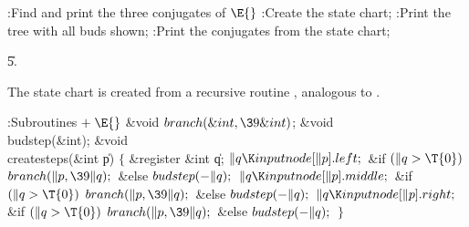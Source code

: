\B{}:Find and print the three conjugates of %
\X${}\E{}$\6
:Create the state chart\X;\6
:Print the tree with all buds shown\X;\6
:Print the conjugates from the state chart\X;\par
\U5.\fi

The state chart is created from a recursive
routine ,
analogous to .

\Y\B\4:Subroutines\X${}\mathrel+\E{}$\6
\&{void} ${}\\{branch}(\&{int},\39\&{int}){}$;\6
\&{void} \\{budstep}(\&{int});\7
\&{void} \\{createsteps}(\&{int} \|p)\1\1\2\2\6
${}\{{}$\1\6
\&{register} \&{int} \|q;\7
${}\|q\K\\{inputnode}[\|p].\\{left};{}$\6
\&{if} ${}(\|q>\T{0}){}$\1\5
${}\\{branch}(\|p,\39\|q);{}$\2\6
\&{else}\1\5
${}\\{budstep}({-}\|q);{}$\2\6
${}\|q\K\\{inputnode}[\|p].\\{middle};{}$\6
\&{if} ${}(\|q>\T{0}){}$\1\5
${}\\{branch}(\|p,\39\|q);{}$\2\6
\&{else}\1\5
${}\\{budstep}({-}\|q);{}$\2\6
${}\|q\K\\{inputnode}[\|p].\\{right};{}$\6
\&{if} ${}(\|q>\T{0}){}$\1\5
${}\\{branch}(\|p,\39\|q);{}$\2\6
\&{else}\1\5
${}\\{budstep}({-}\|q);{}$\2\6
\4${}\}{}$\2\par
\fi

